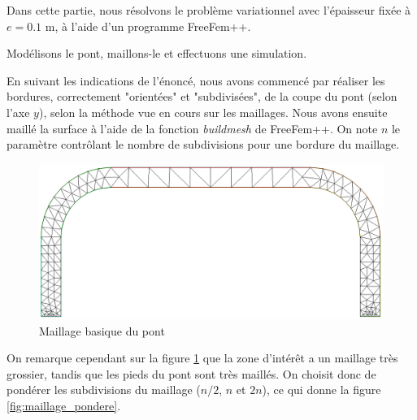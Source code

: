 
Dans cette partie, nous résolvons le problème variationnel avec l'épaisseur fixée à $e=0.1$ m, à l'aide d'un programme FreeFem++.


\begin{problem}{3}
    Modélisons le pont, maillons-le et effectuons une simulation.
\end{problem}


\begin{solution}   
    En suivant les indications de l'énoncé, nous avons commencé par réaliser les bordures, correctement "orientées" et "subdivisées", de la coupe du pont (selon l'axe $y$),
    selon la méthode vue en cours sur les maillages.%
    Nous avons ensuite maillé la surface à l'aide de la fonction \emph{buildmesh} de FreeFem++.
    On note $n$ le paramètre contrôlant le nombre de subdivisions pour une bordure du maillage.

    \begin{figure}      
        \begin{center}
        
            \includegraphics[width=12cm]{imgs/all_maillage_default.PNG}
            \caption{Maillage basique du pont}
            \label{fig:maillage_default}
        
        \end{center}
    \end{figure}

    On remarque cependant sur la figure \ref{fig:maillage_default} que la zone d'intérêt a un maillage très grossier, tandis que les pieds du pont sont très maillés. 
    On choisit donc de pondérer les subdivisions du maillage ($n/2$, $n$ et $2n$), ce qui donne la figure \ref{fig:maillage_pondere}.
    
    \begin{figure}     
        \begin{center}
        

\end{center}
\end{figure}
\end{solution}
